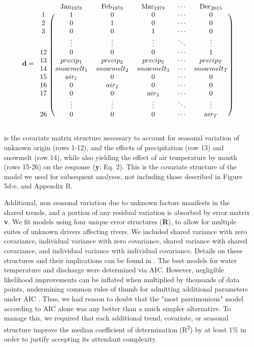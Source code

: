 \documentclass[notitlepage]{article}
\begin{document}
$$
\textbf{d} = \begin{blockarray}{cccccc}
& \textrm{Jan}_{1978} & \textrm{Feb}_{1978} & \textrm{Mar}_{1978} & \cdots & \textrm{Dec}_{2015} \\
\begin{block}{c(ccccc)}
    1 & 1 & 0 & 0 & \cdots & 0 \\
    2 & 0 & 1 & 0 & \cdots & 0 \\
    3 & 0 & 0 & 1 & \cdots & 0 \\
      & \vdots & \vdots & \vdots & \ddots & \vdots \\
    12 & 0 & 0 & 0 & \cdots & 1 \\
    13 & precip_1 & precip_2 & precip_3 & \cdots & precip_T \\
    14 & snowmelt_1 & snowmelt_2 & snowmelt_3 & \cdots & snowmelt_T \\
    15 & air_1 & 0 & 0 & \cdots & 0 \\
    16 & 0 & air_2 & 0 & \cdots & 0 \\
    17 & 0 & 0 & air_3 & \cdots & 0 \\
      & \vdots & \vdots & \vdots & \ddots & \vdots \\
    26 & 0 & 0 & 0 & \cdots & air_T \\
\end{block}
\end{blockarray}
$$

\noindent
is the covariate matrix structure necessary to account for seasonal variation of unknown origin (rows 1-12), and the effects of precipitation (row 13) and snowmelt (row 14), while also yielding the effect of air temperature by month (rows 15-26) on the response (\textbf{y}; Eq. 2). This is the covariate structure of the model we used for subsequent analyses, not including those described in Figure 5d-e, and Appendix B.

Additional, non seasonal variation due to unknown factors manifests in the shared trends, and a portion of any residual variation is absorbed by error matrix \textbf{v}. We fit models using four unique error structures (\textbf{R}), to allow for multiple suites of unknown drivers affecting rivers. We included shared variance with zero covariance, individual variance with zero covariance, shared variance with shared covariance, and individual variance with individual covariance. Details on these structures and their implications can be found in \citep{holmes2012marss}. The best models for water temperature and discharge were determined via AIC. However, negligible likelihood improvements can be inflated when multiplied by thousands of data points, undermining common rules of thumb for admitting additional parameters under AIC \citep{burnham2003model}. Thus, we had reason to doubt that the "most parsimonious" model according to AIC alone was any better than a much simpler alternative. To manage this, we required that each additional trend, covariate, or seasonal structure improve the median coefficient of determination (R\textsuperscript{2}) by at least 1\% in order to justify accepting its attendant complexity.
\end{document}
